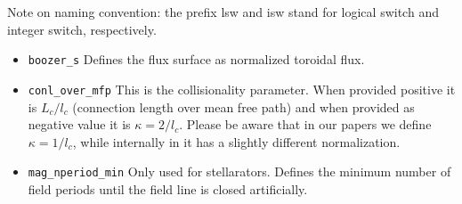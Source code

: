 \documentclass{article}
\newcommand{\vv}[1]{\texttt{\detokenize{#1}}}
\begin{document}
Note on naming convention: the prefix lsw and isw stand for logical
switch and integer switch, respectively.

\begin{itemize}
 \item \verb|boozer_s| \newline
 Defines the flux surface as normalized toroidal flux.
 \item \verb|conl_over_mfp|\newline
 This is the collisionality parameter. When provided positive it is
 $L_c/l_c$ (connection length over mean free path) and when provided as
 negative value it is $\kappa = 2/l_c$. Please be aware that in our
 papers we define $\kappa = 1/l_c$, while internally in \vv{neo-2} it has a
 slightly different normalization.
 \item \verb|mag_nperiod_min|\newline
 Only used for stellarators. Defines the minimum number of field periods
 until the field line is closed artificially.
\end{itemize}
\end{document}
